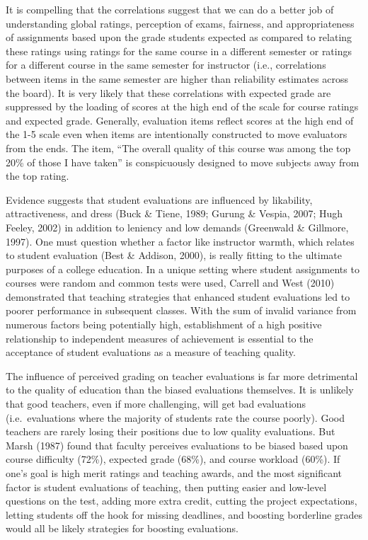 \documentclass[,man]{apa6}
\theoremstyle{definition}
\theoremstyle{definition}
\theoremstyle{definition}
\theoremstyle{remark}
\begin{document}
It is compelling that the correlations suggest that we can do a better
job of understanding global ratings, perception of exams, fairness, and
appropriateness of assignments based upon the grade students expected as
compared to relating these ratings using ratings for the same course in
a different semester or ratings for a different course in the same
semester for instructor (i.e., correlations between items in the same
semester are higher than reliability estimates across the board). It is
very likely that these correlations with expected grade are suppressed
by the loading of scores at the high end of the scale for course ratings
and expected grade. Generally, evaluation items reflect scores at the
high end of the 1-5 scale even when items are intentionally constructed
to move evaluators from the ends. The item, \enquote{The overall quality
of this course was among the top 20\% of those I have taken} is
conspicuously designed to move subjects away from the top rating.

Evidence suggests that student evaluations are influenced by likability,
attractiveness, and dress (Buck \& Tiene, 1989; Gurung \& Vespia, 2007;
Hugh Feeley, 2002) in addition to leniency and low demands (Greenwald \&
Gillmore, 1997). One must question whether a factor like instructor
warmth, which relates to student evaluation (Best \& Addison, 2000), is
really fitting to the ultimate purposes of a college education. In a
unique setting where student assignments to courses were random and
common tests were used, Carrell and West (2010) demonstrated that
teaching strategies that enhanced student evaluations led to poorer
performance in subsequent classes. With the sum of invalid variance from
numerous factors being potentially high, establishment of a high
positive relationship to independent measures of achievement is
essential to the acceptance of student evaluations as a measure of
teaching quality.

The influence of perceived grading on teacher evaluations is far more
detrimental to the quality of education than the biased evaluations
themselves. It is unlikely that good teachers, even if more challenging,
will get bad evaluations (i.e.~evaluations where the majority of
students rate the course poorly). Good teachers are rarely losing their
positions due to low quality evaluations. But Marsh (1987) found that
faculty perceives evaluations to be biased based upon course difficulty
(72\%), expected grade (68\%), and course workload (60\%). If one's goal
is high merit ratings and teaching awards, and the most significant
factor is student evaluations of teaching, then putting easier and
low-level questions on the test, adding more extra credit, cutting the
project expectations, letting students off the hook for missing
deadlines, and boosting borderline grades would all be likely strategies
for boosting evaluations.
\end{document}
